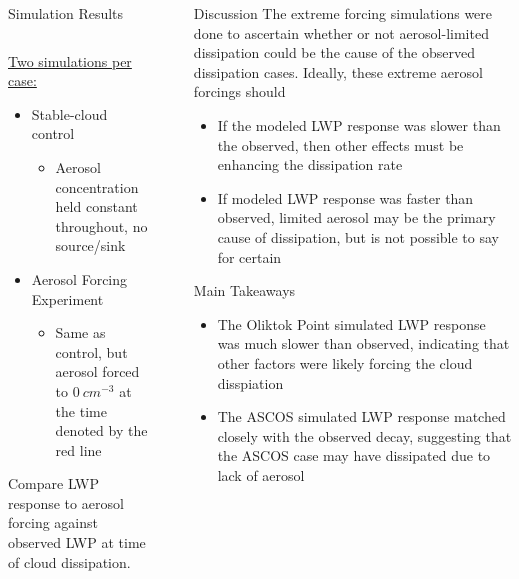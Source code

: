 \documentclass[final]{beamer}
\newlength{\sepwid}
\newlength{\onecolwid}
\newlength{\twocolwid}
\begin{document}
\begin{frame}[t]
\begin{columns}[t]
\begin{column}{\twocolwid}
\begin{alertblock}{Simulation Results}
\begin{column}{0.39\linewidth}
			\underline{Two simulations per case:}
			\begin{itemize}
				\item Stable-cloud control
				\begin{itemize}
					\item Aerosol concentration held constant throughout, no source/sink
				\end{itemize}
				\item Aerosol Forcing Experiment
				\begin{itemize}
					\item Same as control, but aerosol forced to $0\ cm^{-3}$ at the time denoted by the red line
				\end{itemize}
			\end{itemize}
			\vspace{0.1em}
			Compare LWP response to aerosol forcing against observed LWP at time of cloud dissipation.

		\end{column}
	\end{alertblock}
\end{column}



\begin{column}{\sepwid}\end{column}

\begin{column}{\onecolwid}
	\begin{block}{Discussion}
		The extreme forcing simulations were done to ascertain whether or not aerosol-limited dissipation could be the cause of the observed dissipation cases. Ideally, these extreme aerosol forcings should

		\begin{itemize}
			\item If the modeled LWP response was slower than the observed, then other effects must be enhancing the dissipation rate
			\item If modeled LWP response was faster than observed, limited aerosol may be the primary cause of dissipation, but is not possible to say for certain
		\end{itemize}
		
	\end{block}
	\begin{alertblock}{Main Takeaways}
		\begin{itemize}
			\item The Oliktok Point simulated LWP response was much slower than observed, indicating that other factors were likely forcing the cloud disspiation	
			\item The ASCOS simulated LWP response matched closely with the observed decay, suggesting that the ASCOS case may have dissipated due to lack of aerosol
		\end{itemize}
	\end{alertblock}
	

\end{column}
\end{columns}
\end{frame}
\end{document}

